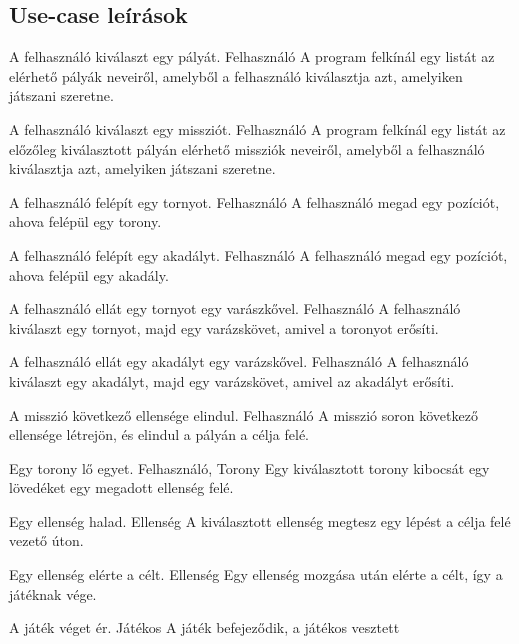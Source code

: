 \subsection{Use-case leírások}


{A felhasználó kiválaszt egy pályát.}
{Felhasználó}
{A program felkínál egy listát az elérhető pályák neveiről, amelyből a felhasználó kiválasztja azt, amelyiken játszani szeretne.}

{A felhasználó kiválaszt egy missziót.}
{Felhasználó}
{A program felkínál egy listát az előzőleg kiválasztott pályán elérhető missziók neveiről, amelyből a felhasználó kiválasztja azt, amelyiken játszani szeretne.}

{A felhasználó felépít egy tornyot.}
{Felhasználó}
{A felhasználó megad egy pozíciót, ahova felépül egy torony.}

{A felhasználó felépít egy akadályt.}
{Felhasználó}
{A felhasználó megad egy pozíciót, ahova felépül egy akadály.}

{A felhasználó ellát egy tornyot egy varászkővel.}
{Felhasználó}
{A felhasználó kiválaszt egy tornyot, majd egy varázskövet, amivel a toronyot erősíti.}

{A felhasználó ellát egy akadályt egy varázskővel.}
{Felhasználó}
{A felhasználó kiválaszt egy akadályt, majd egy varázskövet, amivel az akadályt erősíti.}

{A misszió következő ellensége elindul.}
{Felhasználó}
{A misszió soron következő ellensége létrejön, és elindul a pályán a célja felé.}

{Egy torony lő egyet.}
{Felhasználó, Torony}
{Egy kiválasztott torony kibocsát egy lövedéket egy megadott ellenség felé.}

{Egy ellenség halad.}
{Ellenség}
{A kiválasztott ellenség megtesz egy lépést a célja felé vezető úton.}

{Egy ellenség elérte a célt.}
{Ellenség}
{Egy ellenség mozgása után elérte a célt, így a játéknak vége.}

{A játék véget ér.}
{Játékos}
{A játék befejeződik, a játékos vesztett}


